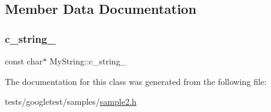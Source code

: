 \subsection{Member Data Documentation}
\mbox{\label{classMyString_a1872c0d04ff5f6e654161472b18bb9d0}} 
\subsubsection{\texorpdfstring{c\+\_\+string\+\_\+}{c\_string\_}}
{\footnotesize\ttfamily const char$\ast$ My\+String\+::c\+\_\+string\+\_\+\hspace{0.3cm}{\ttfamily [private]}}



The documentation for this class was generated from the following file\+:\begin{DoxyCompactItemize}
\item 
tests/googletest/samples/\hyperlink{sample2_8h}{sample2.\+h}\end{DoxyCompactItemize}
